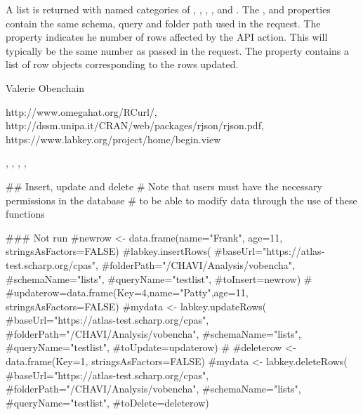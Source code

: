 \documentclass{book}
\begin{document}
\begin{Value}
A list is returned with named categories of , , , ,  and .
The ,  and  properties contain the same schema, query 
and folder path used in the request.  The
 property indicates he number of rows affected by the API action. This will typically be the same
number as passed in the request. The  property contains a list of row objects corresponding to the rows
updated.
\end{Value}
\begin{Author}\relax
Valerie Obenchain
\end{Author}
\begin{References}\relax
http://www.omegahat.org/RCurl/, \\
http://dssm.unipa.it/CRAN/web/packages/rjson/rjson.pdf,\\
https://www.labkey.org/project/home/begin.view
\end{References}
\begin{SeeAlso}\relax
{}, , , 
, \\
\end{SeeAlso}
\begin{Examples}
\begin{ExampleCode}
## Insert, update and delete
# Note that users must have the necessary permissions in the database
# to be able to modify data through the use of these functions

### Not run
#newrow <- data.frame(name="Frank", age=11, stringsAsFactors=FALSE)
#labkey.insertRows(
#baseUrl="https://atlas-test.scharp.org/cpas", 
#folderPath="/CHAVI/Analysis/vobencha", 
#schemaName="lists", 
#queryName="testlist", 
#toInsert=newrow)
#
#updaterow=data.frame(Key=4,name="Patty",age=11, stringsAsFactors=FALSE)
#mydata <- labkey.updateRows(
#baseUrl="https://atlas-test.scharp.org/cpas", 
#folderPath="/CHAVI/Analysis/vobencha", 
#schemaName="lists", 
#queryName="testlist", 
#toUpdate=updaterow)
#
#deleterow <- data.frame(Key=1, stringsAsFactors=FALSE)
#mydata <- labkey.deleteRows(
#baseUrl="https://atlas-test.scharp.org/cpas", 
#folderPath="/CHAVI/Analysis/vobencha", 
#schemaName="lists", 
#queryName="testlist", 
#toDelete=deleterow)

\end{ExampleCode}
\end{Examples}
\end{document}
